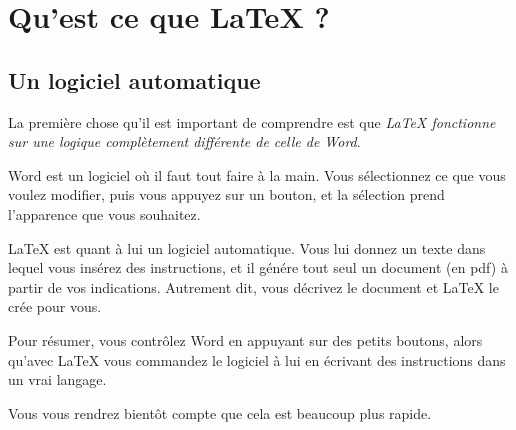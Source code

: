 \documentclass[10pt]{article}
\begin{document}

\section{Qu'est ce que LaTeX ?}

\subsection{Un logiciel automatique}
La première chose qu'il est important de comprendre est que \emph{LaTeX fonctionne sur une logique complètement différente de celle de Word}. 

Word est un logiciel où il faut tout faire à la main. Vous sélectionnez ce que vous voulez modifier, puis vous appuyez sur un bouton, et la sélection prend l'apparence que vous souhaitez.

LaTeX est quant à lui un logiciel automatique. Vous lui donnez un texte dans lequel vous insérez des instructions, et il génére tout seul un document (en pdf) à partir de vos indications. Autrement dit, vous décrivez le document et LaTeX le crée pour vous.


Pour résumer, vous contrôlez Word en appuyant sur des petits boutons, alors qu'avec LaTeX vous commandez le logiciel à lui en écrivant des instructions dans un vrai langage.

Vous vous rendrez bientôt compte que cela est beaucoup plus rapide.
\end{document}
